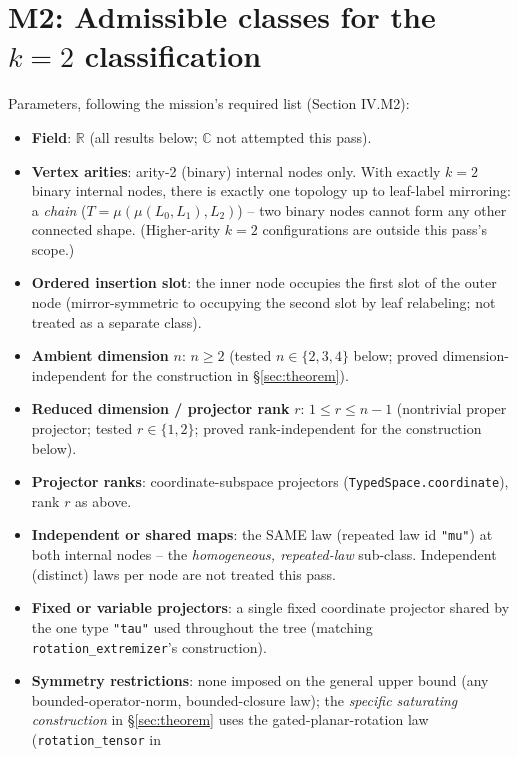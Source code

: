 \section*{M2: Admissible classes for the $k=2$ classification}

Parameters, following the mission's required list (Section IV.M2):

\begin{itemize}
  \item \textbf{Field}: $\mathbb{R}$ (all results below; $\mathbb{C}$ not
    attempted this pass).
  \item \textbf{Vertex arities}: arity-2 (binary) internal nodes only.
    With exactly $k=2$ binary internal nodes, there is exactly one
    topology up to leaf-label mirroring: a \emph{chain}
    ($T = \mu(\mu(L_0,L_1), L_2)$) -- two binary nodes cannot form any
    other connected shape. (Higher-arity $k=2$ configurations are outside
    this pass's scope.)
  \item \textbf{Ordered insertion slot}: the inner node occupies the
    first slot of the outer node (mirror-symmetric to occupying the
    second slot by leaf relabeling; not treated as a separate class).
  \item \textbf{Ambient dimension} $n$: $n \ge 2$ (tested $n \in
    \{2,3,4\}$ below; proved dimension-independent for the construction
    in \S\ref{sec:theorem}).
  \item \textbf{Reduced dimension / projector rank} $r$: $1 \le r \le
    n-1$ (nontrivial proper projector; tested $r\in\{1,2\}$; proved
    rank-independent for the construction below).
  \item \textbf{Projector ranks}: coordinate-subspace projectors
    (\texttt{TypedSpace.coordinate}), rank $r$ as above.
  \item \textbf{Independent or shared maps}: the SAME law (repeated
    law id \texttt{"mu"}) at both internal nodes -- the
    \emph{homogeneous, repeated-law} sub-class. Independent (distinct)
    laws per node are not treated this pass.
  \item \textbf{Fixed or variable projectors}: a single fixed coordinate
    projector shared by the one type \texttt{"tau"} used throughout the
    tree (matching \texttt{rotation\_extremizer}'s construction).
  \item \textbf{Symmetry restrictions}: none imposed on the general upper
    bound (any bounded-operator-norm, bounded-closure law); the
    \emph{specific saturating construction} in \S\ref{sec:theorem} uses
    the gated-planar-rotation law (\texttt{rotation\_tensor} in

\end{itemize}
